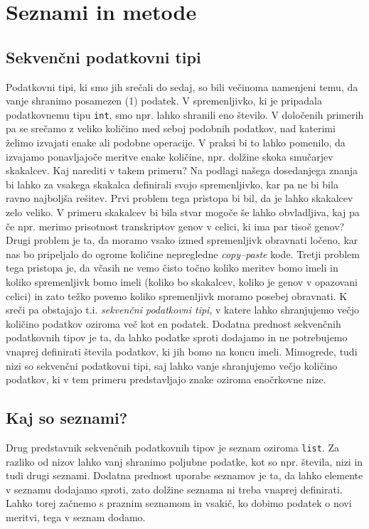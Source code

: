 \chapter{Seznami in metode}

\section{Sekvenčni podatkovni tipi}

Podatkovni tipi, ki smo jih srečali do sedaj, so bili večinoma namenjeni temu, da vanje shranimo posamezen (1) podatek. V spremenljivko, ki je pripadala podatkovnemu tipu \texttt{int}, smo npr. lahko shranili eno število. V določenih primerih pa se srečamo z veliko količino med seboj podobnih podatkov, nad katerimi želimo izvajati enake ali podobne operacije. V praksi bi to lahko pomenilo, da izvajamo ponavljajoče meritve enake količine, npr. dolžine skoka smučarjev skakalcev. Kaj narediti v takem primeru? Na podlagi našega dosedanjega znanja bi lahko za vsakega skakalca definirali svojo spremenljivko, kar pa ne bi bila ravno najboljša rešitev. Prvi problem tega pristopa bi bil, da je lahko skakalcev zelo veliko. V primeru skakalcev bi bila stvar mogoče še lahko obvladljiva, kaj pa če npr. merimo prisotnost transkriptov genov v celici, ki ima par tisoč genov? Drugi problem je ta, da moramo vsako izmed spremenljivk obravnati ločeno, kar nas bo pripeljalo do ogrome količine nepregledne \emph{copy--paste} kode. Tretji problem tega pristopa je, da včasih ne vemo čisto točno koliko meritev bomo imeli in koliko spremenljivk bomo imeli (koliko bo skakalcev, koliko je genov v opazovani celici) in zato težko povemo koliko spremenljivk moramo posebej obravnati. K sreči pa obstajajo t.i. \emph{sekvenčni podatkovni tipi}, v katere lahko shranjujemo večjo količino podatkov oziroma več kot en podatek. Dodatna prednost sekvenčnih podatkovnih tipov je ta, da lahko podatke sproti dodajamo in ne potrebujemo vnaprej definirati števila podatkov, ki jih bomo na koncu imeli. Mimogrede, tudi nizi so sekvenčni podatkovni tipi, saj lahko vanje shranjujemo večjo količino podatkov, ki v tem primeru predstavljajo znake oziroma enočrkovne nize. 

\section{Kaj so seznami?}

Drug predstavnik sekvenčnih podatkovnih tipov je seznam oziroma \texttt{list}. Za razliko od nizov lahko vanj shranimo poljubne podatke, kot so npr. števila, nizi in tudi drugi seznami. Dodatna prednost uporabe seznamov je ta, da lahko elemente v seznamu dodajamo sproti, zato dolžine seznama ni treba vnaprej definirati. Lahko torej začnemo s praznim seznamom in vsakič, ko dobimo podatek o novi meritvi, tega v seznam dodamo. 

